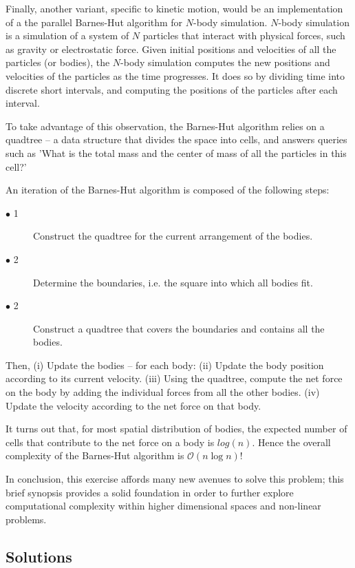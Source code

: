 \documentclass[10pt,a4paper]{article}
\begin{document}
Finally, another variant, specific to kinetic motion, would be an implementation of a the parallel Barnes-Hut algorithm for $N$-body simulation. $N$-body simulation is a simulation of a system of $N$ particles that interact with physical forces, such as gravity or electrostatic force. Given initial positions and velocities of all the particles (or bodies), the $N$-body simulation computes the new positions and velocities of the particles as the time progresses. It does so by dividing time into discrete short intervals, and computing the positions of the particles after each interval.

To take advantage of this observation, the Barnes-Hut algorithm relies on a quadtree -- a data structure that divides the space into cells, and answers queries such as 'What is the total mass and the center of mass of all the particles in this cell?'

An iteration of the Barnes-Hut algorithm is composed of the following steps:

\begin{description}
  \item[$\bullet$ 1] Construct the quadtree for the current arrangement of the bodies.
  \item[$\bullet$ 2] Determine the boundaries, i.e. the square into which all bodies fit.
  \item[$\bullet$ 2] Construct a quadtree that covers the boundaries and contains all the bodies.
\end{description}
Then, 
    (i) Update the bodies -- for each body:
    (ii) Update the body position according to its current velocity.
    (iii) Using the quadtree, compute the net force on the body by adding the individual forces from all the other bodies.
    (iv) Update the velocity according to the net force on that body.
    
It turns out that, for most spatial distribution of bodies, the expected number of cells that contribute to the net force on a body is $log(n)$. Hence the overall complexity of the Barnes-Hut algorithm is  $\mathcal{O}(n\log{}n)$! 

In conclusion, this exercise affords many new avenues to solve this problem; this brief synopsis provides a solid foundation in order to further explore computational complexity within higher dimensional spaces and non-linear problems. 

\pagebreak
\subsection*{Solutions}
\end{document}

